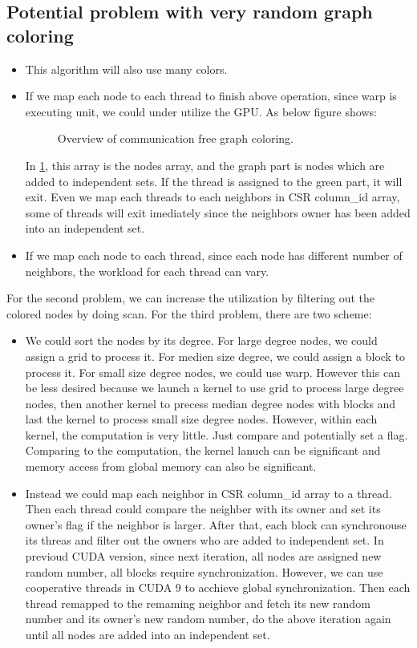 \documentclass[12pt] {article}
\begin{document}
\subsection*{Potential problem with very random graph coloring}
\begin{itemize}
\item This algorithm will also use many colors.
\item If we map each node to each thread to finish above operation, since warp is executing unit, we could under utilize the GPU. As below figure shows:
\begin{figure}[!tbh]
\centering
   \caption{Overview of communication free graph coloring.}
   \label{fig:fig3}
\end{figure}
In \ref{fig:fig3}, this array is the nodes array, and the graph part is nodes which are added to independent sets.
If the thread is assigned to the green part, it will exit.
Even we map each threads to each neighbors in CSR column\_id array, some of threads will exit imediately since the neighbors owner has been added into an independent set. 
\item If we map each node to each thread, since each node has different number of neighbors, the workload for each thread can vary.
\end{itemize}
For the second problem, we can increase the utilization by filtering out the colored nodes by doing scan.
For the third problem, there are two scheme:
\begin{itemize}
\item We could sort the nodes by its degree. For large degree nodes, we could assign a grid to process it. For medien size degree, we could assign a block to process it. For small size degree nodes, we could use warp. However this can be less desired because we launch a kernel to use grid to process large degree nodes, then another kernel to precess median degree nodes with blocks and last the kernel to process small size degree nodes. However, within each kernel, the computation is very little. Just compare and potentially set a flag. Comparing to the computation, the kernel lanuch can be significant and memory access from global memory can also be significant.
\item Instead we could map each neighbor in CSR column\_id array to a thread. Then each thread could compare the neighber with its owner and set its owner's flag if the neighbor is larger. After that, each block can synchronouse its threas and filter out the owners who are added to independent set. In previoud CUDA version, since next iteration, all nodes are assigned new random number, all blocks require synchronization. However, we can use cooperative threads in CUDA 9 to acchieve global synchronization. Then each thread remapped to the remaming neighbor and fetch its new random number and its owner's new random number, do the above iteration again until all nodes are added into an independent set.
\end{itemize}
\end{document}
